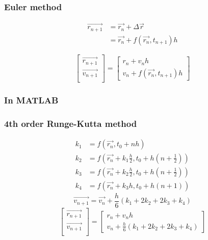 \documentclass[english,12pt,a4paper]{beamer}
\begin{document}
	\begin{frame}
		\frametitle{Euler method}
		\begin{equation}
			\begin{split}
				\vec{r_{n+1}} &= \vec{r_{n}} + \Delta \vec{r} \\
				&= \vec{r_{n}} + f(\vec{r_n}, t_{n + 1 }) h
			\end{split}
		\end{equation}
		
		\begin{equation}
			\begin{bmatrix}
				\vec{r_{n+1}}\\
				\vec{v_{n+1}}\\
			\end{bmatrix}
			=
			\begin{bmatrix}
				r_n + v_n h\\
				v_n + f(\vec{r_n}, t_{n+1}) h
			\end{bmatrix}
		\end{equation}
	\end{frame}
	
	\begin{frame}
		\frametitle{In MATLAB}
		
	\end{frame}
	
	\begin{frame}
		\frametitle{4th order Runge-Kutta method}
		\begin{equation}\label{eq:RK4}
			\begin{split}
				k_1 &= f(\vec{r_n},  t_0 + n h)\\
				k_2 &= f\left(\vec{r_n} + k_1 \frac{h}{2}, t_0 + h(n + \frac{1}{2})\right)\\
				k_3 &= f\left(\vec{r_n} + k_2 \frac{h}{2}, t_0 + h(n + \frac{1}{2})\right)\\
				k_4 &= f\left(\vec{r_n} + k_3 h, t_0 + h(n + 1)\right)
			\end{split}
		\end{equation}
		\begin{equation}
			\vec{v_{n+1}} = \vec{v_n} + \frac{h}{6}(k_1 + 2 k_2 + 2k_3 + k_4)
		\end{equation}
		\begin{equation}
			\begin{bmatrix}
				\vec{r_{n+1}}\\
				\vec{v_{n+1}}\\
			\end{bmatrix}
			=
			\begin{bmatrix}
				r_n + v_n h\\
				v_n + \frac{h}{6}(k_1 + 2 k_2 + 2k_3 + k_4)
			\end{bmatrix}
		\end{equation}
	\end{frame}
	
\end{document}
